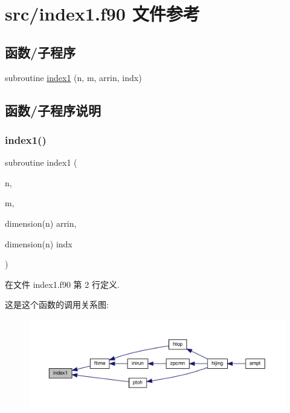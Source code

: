 \hypertarget{index1_8f90}{}\section{src/index1.f90 文件参考}
\label{index1_8f90}
\subsection*{函数/子程序}
\begin{DoxyCompactItemize}
\item 
subroutine \mbox{\hyperlink{index1_8f90_ae5b1dd0306a0025811a35534da3da81a}{index1}} (n, m, arrin, indx)
\end{DoxyCompactItemize}


\subsection{函数/子程序说明}
\mbox{\label{index1_8f90_ae5b1dd0306a0025811a35534da3da81a}} 
\subsubsection{\texorpdfstring{index1()}{index1()}}
{\footnotesize\ttfamily subroutine index1 (\begin{DoxyParamCaption}\item[{}]{n,  }\item[{}]{m,  }\item[{dimension(n)}]{arrin,  }\item[{dimension(n)}]{indx }\end{DoxyParamCaption})}



在文件 index1.\+f90 第 2 行定义.

这是这个函数的调用关系图\+:
\nopagebreak
\begin{figure}[H]
\begin{center}
\leavevmode
\includegraphics[width=350pt]{index1_8f90_ae5b1dd0306a0025811a35534da3da81a_icgraph}
\end{center}
\end{figure}
